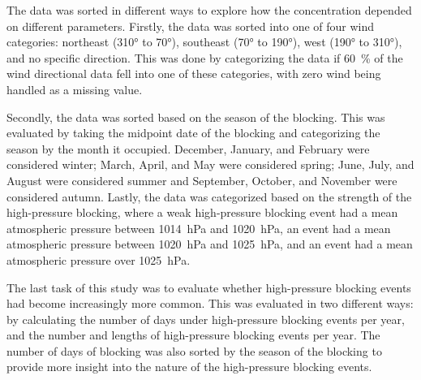 The data was sorted in different ways to explore how the \PM concentration depended on different parameters. Firstly, the data was sorted into one of four wind categories: northeast (310° to 70°), southeast (70° to 190°), west (190° to 310°), and no specific direction. This was done by categorizing the data if \SI{60}{\%} of the wind directional data fell into one of these categories, with zero wind being handled as a missing value.

Secondly, the data was sorted based on the season of the blocking. This was evaluated by taking the midpoint date of the blocking and categorizing the season by the month it occupied. December, January, and February were considered winter; March, April, and May were considered spring; June, July, and August were considered summer and September, October, and November were considered autumn. Lastly, the data was categorized based on the strength of the high-pressure blocking, where a weak high-pressure blocking event had a mean atmospheric pressure between \SI{1014}{\hecto\pascal} and \SI{1020}{\hecto\pascal}, an event had a mean atmospheric pressure between \SI{1020}{\hecto\pascal} and \SI{1025}{\hecto\pascal}, and an event had a mean atmospheric pressure over \SI{1025}{\hecto\pascal}.

The last task of this study was to evaluate whether high-pressure blocking events had become increasingly more common. This was evaluated in two different ways: by calculating the number of days under high-pressure blocking events per year, and the number and lengths of high-pressure blocking events per year. The number of days of blocking was also sorted by the season of the blocking to provide more insight into the nature of the high-pressure blocking events. 

